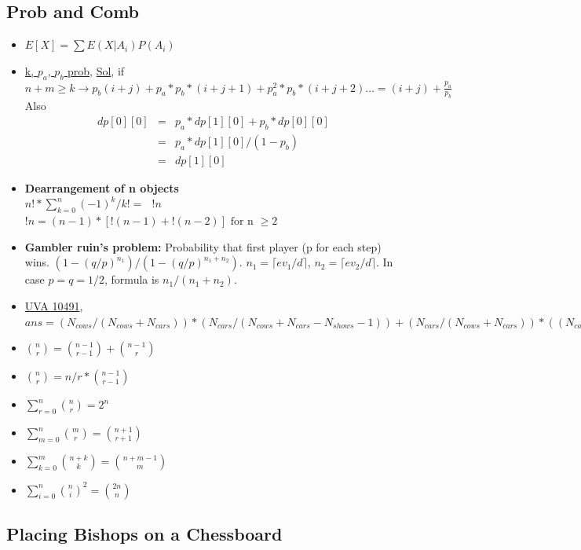 \documentclass[8pt, a4paper, oneside, twocolumn]{extarticle}
\begin{document}
\subsection{Prob and Comb}
\begin{itemize}
    \item $E[X] = \sum E(X|A_i)P(A_i)$
    \item \href {https://codeforces.com/contest/908/problem/D}{k, $p_a$, $p_b$ prob}, \href {https://github.com/sourabh2311/Competitive-Programming/blob/master/CF/Good%20Bye%202017/D.cpp}{Sol}, if $n + m \geq k \rightarrow p_b(i + j) + p_a*p_b*(i + j + 1) + p_a^2*p_b*(i + j + 2)\dots = (i + j) + \frac{p_a}{p_b}$ Also
    \begin{eqnarray}
    dp[0][0] & = & p_a * dp[1][0] + p_b * dp[0][0]\\
             & = & p_a * dp[1][0] / (1 - p_b)\\
             & = & dp[1][0]
    \end{eqnarray}
    \item \textbf{Dearrangement of n objects}
    \\ $n! * \sum_{k = 0}^n (-1)^k / {k!} =\text{ } !n$
    \\ $!n = (n - 1) * [!(n - 1) + !(n - 2)] \text{ for n }\geq 2$
    \item \textbf{Gambler ruin's problem: }Probability that first player (p for each step) wins. $(1 - (q/p)^{n_1})/(1 - (q/p)^{n_1 + n_2})$. $n_1 = \lceil ev_1/d \rceil$, $n_2 = \lceil ev_2/d \rceil$. In case $p = q = 1/2$, formula is $n_1/(n_1 + n_2)$.
    \item \href{}{UVA 10491}, $ans = (N_{cows} / (N_{cows} + N_{cars})) * (N_{cars} / (N_{cows} + N_{cars} - N_{shows} - 1)) + (N_{cars} / (N_{cows} + N_{cars})) * ((N_{cars} - 1) / (N_{cows} + N_{cars} - N_{shows} - 1))$
    \item $\binom{n}{r} = \binom{n - 1}{r - 1} + \binom{n - 1}{r}$
    \item $\binom{n}{r} = n / r * \binom{n - 1}{r - 1}$
    \item $\sum_{r = 0}^n \binom{n}{r} = 2^n$
    \item $\sum_{m = 0}^n \binom{m}{r} = \binom{n + 1}{r + 1}$
    \item $\sum_{k = 0}^m \binom{n + k}{k} = \binom{n + m - 1}{m}$
    \item $\sum_{i = 0}^n \binom{n}{i}^2 = \binom{2n}{n}$
\end{itemize}
\subsection{Placing Bishops on a Chessboard}
\end{document}
